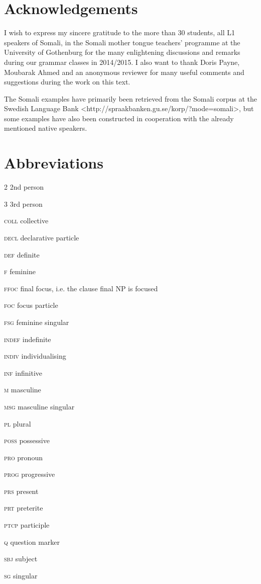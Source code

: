 \documentclass[output=paper]{langsci/langscibook}
\begin{document}
\section*{Acknowledgements}

I wish to express my sincere gratitude to the more than 30 students, all L1 speakers of Somali, in the Somali mother tongue teachers’ programme at the University of Gothenburg for the many enlightening discussions and remarks during our grammar classes in 2014/2015. I also want to thank Doris Payne, Moubarak Ahmed and an anonymous reviewer for many useful comments and suggestions during the work on this text.

The Somali examples have primarily been retrieved from the Somali corpus at the Swedish Language Bank {\textless}http://spraakbanken.gu.se/korp/?mode=somali{\textgreater}, but some examples have also been constructed in cooperation with the already mentioned native speakers.

\section*{Abbreviations}

2  2nd person

3  3rd person

\textsc{coll}  collective

\textsc{decl}  declarative particle

\textsc{def}  definite

\textsc{f}  feminine

\textsc{ffoc}  final focus, i.e. the clause final NP is focused

\textsc{foc}  focus particle

\textsc{fsg}  feminine singular

\textsc{indef}  indefinite

\textsc{indiv}  individualising

\textsc{inf  }infinitive

\textsc{m}  masculine

\textsc{msg}  masculine singular

\textsc{pl}  plural

\textsc{poss}  possessive

\textsc{pro}  pronoun

\textsc{prog}  progressive

\textsc{prs}  present

\textsc{prt}  preterite

\textsc{ptcp  }participle

\textsc{q  }question marker

\textsc{sbj}  subject

\textsc{sg}  singular
 
 

\printbibliography[heading=subbibliography,notkeyword=this]
\end{document}
